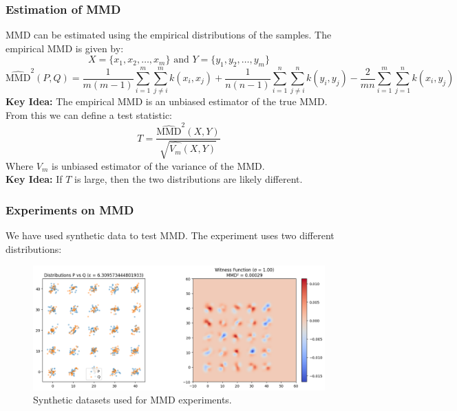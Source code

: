\documentclass{beamer}
\begin{document}
\begin{frame}
    \frametitle{Estimation of MMD}
    MMD can be estimated using the empirical distributions of the samples. The empirical MMD is given by:
    \[
         X = \{x_1, x_2, \ldots, x_m\} \text{ and } Y = \{y_1, y_2, \ldots, y_m\}
    \]
    \scriptsize \[
        \widehat{\text{MMD}}^2(P, Q) = \frac{1}{m(m-1)} \sum_{i=1}^{m} \sum_{j \neq i}^{m} k(x_i, x_j) + \frac{1}{n(n-1)} \sum_{i=1}^{n} \sum_{j \neq i}^{n} k(y_i, y_j) - \frac{2}{mn} \sum_{i=1}^{m} \sum_{j=1}^{n} k(x_i, y_j)
    \]
    \normalsize
    \textbf{Key Idea:} The empirical MMD is an unbiased estimator of the true MMD.\\
    From this we can define a test statistic:
    \[
        T = \frac{\hat{\text{MMD}}^2(X,Y)}{\sqrt{\hat{V_m}(X,Y)}}
    \]
    Where \(V_m\) is unbiased estimator of the variance of the MMD.\\
    \textbf{Key Idea:} If \(T\) is large, then the two distributions are likely different.\\

\end{frame}

\begin{frame}
    \frametitle{Experiments on MMD}
    We have used synthetic data to test MMD. The experiment uses two different distributions:
    \begin{figure}[h]
        \centering
        \includegraphics[width=0.9\linewidth]{mmdDataset.png}
        \caption{Synthetic datasets used for MMD experiments.}
    \end{figure}
\end{frame}
\end{document}

